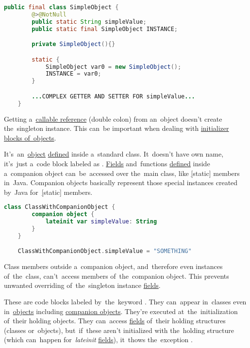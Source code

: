 \begin{lstlisting}[language=Java]
    public final class SimpleObject {
        @>@NotNull
        public static String simpleValue;
        public static final SimpleObject INSTANCE;

        private SimpleObject(){}

        static {
            SimpleObject var0 = new SimpleObject();
            INSTANCE = var0;
        }

        ...COMPLEX GETTER AND SETTER FOR simpleValue...
    }
\end{lstlisting}

\warning Getting a~\hyperref[kotlincallablereference]{callable reference} (double colon) from an~object doesn't create the~singleton instance.
This can~be important when dealing with \hyperref[objectinitblock]{initializer blocks of~objects}.

\label{companionobject}
It's~an~\hyperref[kotlinobject]{object} \hyperref[declarationdefinition]{defined} inside a~standard class.
It~doesn't have own name, it's~just a~code block labeled as .
\hyperref[variablefieldproperty]{Fields} and~functions \hyperref[declarationdefinition]{defined} inside a~companion object can~be~accessed over the~main class, like \hyperref[javastatic][static] members in~Java.
Companion objects basically represent those special instances created by~Java for~\hyperref[javastatic][static] members.

\begin{lstlisting}[language=Kotlin]
    class ClassWithCompanionObject {
        companion object {
            lateinit var simpleValue: String
        }
    }

    ClassWithCompanionObject.simpleValue = "SOMETHING"
\end{lstlisting}

\note Class members outside a~companion object, and~therefore even instances of~the~class, can't~access members of~the~companion object.
This prevents unwanted overriding of~the~singleton instance \hyperref[variablefieldproperty]{fields}.

\label{kotlininitblock}
These are code blocks labeled by~the~keyword .
They can~appear in~classes even in~\hyperref[kotlinobject]{objects} including \hyperref[companionobject]{companion objects}.
They're executed at~the~initialization of~their holding objects.
They can~access \hyperref[variablefieldproperty]{fields} of~their holding structures (classes or~objects), but~if~these aren't initialized with the~holding structure (which can~happen for~\textit{lateinit} \hyperref[variablefieldproperty]{fields}), it~thows the~exception .

